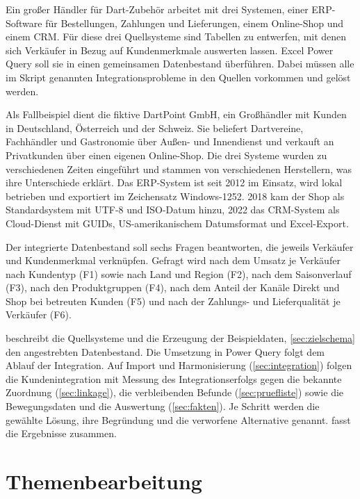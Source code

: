\documentclass[a4paper,12pt]{article}
\begin{document}
Ein großer Händler für Dart-Zubehör arbeitet mit drei Systemen, einer ERP-Software für Bestellungen, Zahlungen und Lieferungen, einem Online-Shop und einem CRM. Für diese drei Quellsysteme sind Tabellen zu entwerfen, mit denen sich Verkäufer in Bezug auf Kundenmerkmale auswerten lassen. Excel Power Query soll sie in einen gemeinsamen Datenbestand überführen. Dabei müssen alle im Skript genannten Integrationsprobleme in den Quellen vorkommen und gelöst werden.

Als Fallbeispiel dient die fiktive DartPoint GmbH, ein Großhändler mit Kunden in Deutschland, Österreich und der Schweiz. Sie beliefert Dartvereine, Fachhändler und Gastronomie über Außen- und Innendienst und verkauft an Privatkunden über einen eigenen Online-Shop. Die drei Systeme wurden zu verschiedenen Zeiten eingeführt und stammen von verschiedenen Herstellern, was ihre Unterschiede erklärt. Das ERP-System ist seit 2012 im Einsatz, wird lokal betrieben und exportiert im Zeichensatz Windows-1252. 2018 kam der Shop als Standardsystem mit UTF-8 und ISO-Datum hinzu, 2022 das CRM-System als Cloud-Dienst mit GUIDs, US-amerikanischem Datumsformat und Excel-Export.

Der integrierte Datenbestand soll sechs Fragen beantworten, die jeweils Verkäufer und Kundenmerkmal verknüpfen. Gefragt wird nach dem Umsatz je Verkäufer nach Kundentyp (F1) sowie nach Land und Region (F2), nach dem Saisonverlauf (F3), nach den Produktgruppen (F4), nach dem Anteil der Kanäle Direkt und Shop bei betreuten Kunden (F5) und nach der Zahlungs- und Lieferqualität je Verkäufer (F6).

 beschreibt die Quellsysteme und die Erzeugung der Beispieldaten, \cref{sec:zielschema} den angestrebten Datenbestand. Die Umsetzung in Power Query folgt dem Ablauf der Integration. Auf Import und Harmonisierung (\cref{sec:integration}) folgen die Kundenintegration mit Messung des Integrationserfolgs gegen die bekannte Zuordnung (\cref{sec:linkage}), die verbleibenden Befunde (\cref{sec:pruefliste}) sowie die Bewegungsdaten und die Auswertung (\cref{sec:fakten}). Je Schritt werden die gewählte Lösung, ihre Begründung und die verworfene Alternative genannt.  fasst die Ergebnisse zusammen.

\section{Themenbearbeitung}\label{sec:themen}
\end{document}
